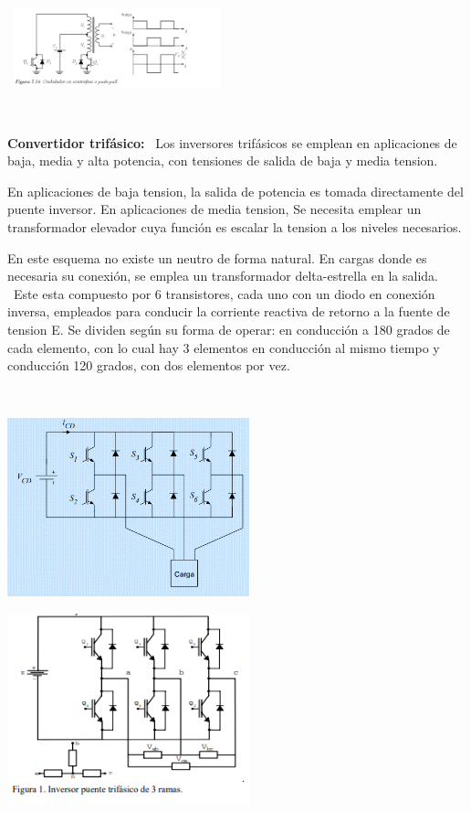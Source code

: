 \documentclass[12pt,letterpaper]{article}
\begin{document}
\

\
\includegraphics[width=6cm]{Push Pull CC-CA.png} 
\

\

\textbf{Convertidor trifásico:}
\
Los inversores trifásicos se emplean en aplicaciones de baja, media y alta potencia, con tensiones de salida de baja y media tension.

En aplicaciones de baja tension, la salida de potencia es tomada directamente del puente inversor.
En aplicaciones de media tension, Se necesita emplear un transformador elevador cuya función es escalar la tension a los niveles necesarios.

En este esquema no existe un neutro de forma natural. En cargas donde es necesaria su conexión, se emplea un transformador delta-estrella en la salida.
\
Este esta compuesto por 6 transistores, cada uno con un diodo en conexión inversa, empleados para conducir la corriente reactiva de retorno a la fuente de tension E. Se dividen según su forma de operar: en conducción a 180 grados de cada elemento, con lo cual hay 3 elementos en conducción al mismo tiempo y conducción 120 grados, con dos elementos por vez.

\

\includegraphics[width=7cm]{Trifasico.png} 
\

\includegraphics[width=7cm]{Delta-Estrella.png} 
\
\end{document}
